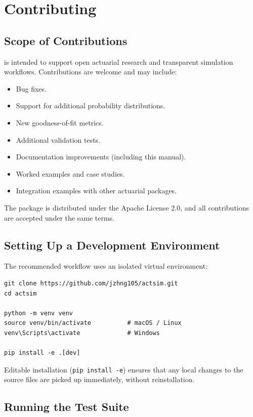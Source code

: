 \chapter{Contributing}
\label{chap:contributing}

\section{Scope of Contributions}

\actsim is intended to support open actuarial research and transparent
simulation workflows. Contributions are welcome and may include:

\begin{itemize}[leftmargin=*]
    \item Bug fixes.
    \item Support for additional probability distributions.
    \item New goodness-of-fit metrics.
    \item Additional validation tests.
    \item Documentation improvements (including this manual).
    \item Worked examples and case studies.
    \item Integration examples with other actuarial packages.
\end{itemize}

The package is distributed under the Apache License 2.0, and all
contributions are accepted under the same terms.

\section{Setting Up a Development Environment}

The recommended workflow uses an isolated virtual environment:

\begin{lstlisting}[style=bashstyle]
git clone https://github.com/jzhng105/actsim.git
cd actsim

python -m venv venv
source venv/bin/activate          # macOS / Linux
venv\Scripts\activate             # Windows

pip install -e .[dev]
\end{lstlisting}

Editable installation (\texttt{pip install -e}) ensures that any local
changes to the source files are picked up immediately, without
reinstallation.

\section{Running the Test Suite}

